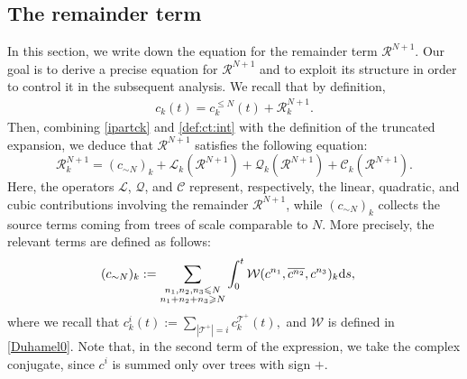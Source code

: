\documentclass[UTF-8,reqno]{amsart}
\numberwithin{equation}{section}
\theoremstyle{definition}
\def\dif{{\mathord{{\rm d}}}}
\def\geq{\geqslant}
\def\leq{\leqslant}
\def\dif{{\mathord{{\rm d}}}}
\def\geq{\geqslant}
\def\leq{\leqslant}
\begin{document}
\subsection{The  remainder term}\label{sec:rem}
In this section, we write down the equation for the remainder term $\mathcal{R}^{N+1}$. Our goal is to derive a precise equation for $\mathcal{R}^{N+1}$ and to exploit its structure in order to control it in the subsequent analysis.
 We recall that by definition,
\begin{align}\label{def:cleqn}
     c_k(t)=c^{\leq N}_k (t)+\mathcal{R}^{N+1}_k.
\end{align}
Then, combining \eqref{ipartck} and \eqref{def:ct:int} with the definition of the truncated expansion, we deduce that $\mathcal{R}^{N+1}$ satisfies the following equation:
\begin{equation}\mathcal{R}_k^{N+1}=(c_{\sim N})_k+\mathscr{L}_k(\mathcal{R}^{N+1}) +\mathscr{Q}_k(\mathcal{R}^{N+1})+\mathscr{C}_k(\mathcal{R}^{N+1}).\label{eqnr}
\end{equation} Here, the operators $\mathscr{L}$, $\mathscr{Q}$, and $\mathscr{C}$ represent, respectively, the linear, quadratic, and cubic contributions involving the remainder $\mathcal{R}^{N+1}$, while $(c_{\sim N})_k$ collects the source terms coming from trees of scale comparable to $N$.
More precisely, the relevant terms are defined as follows: 
\begin{align}
(c_{\sim N})_k&:=\sum_{\substack{n_1, n_2, n_3\leq N\\  n_1+n_2+n_3\geq N}}\int_0^t \mathcal{W}(c^{n_1},\overline {c^{n_2}},c^{n_3})_k\dif s,\notag
\end{align}
where we recall that $c^{i}_k(t):=\sum_{|\mathcal{T}^+|=i}
 c^{\mathcal{T}^+}_k (t),$ and $\mathcal{W}$ is defined in \eqref{Duhamel0}. Note that, in the second term of the expression, we take the complex conjugate, since $c^{i}$ is summed only over trees with sign $+$.
 
\end{document}
